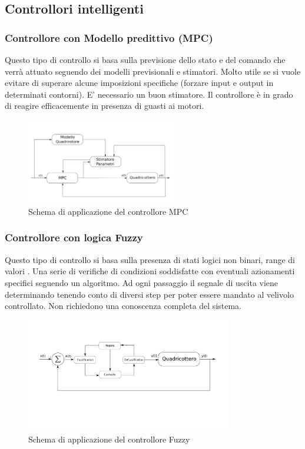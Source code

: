 \subsection{Controllori intelligenti}

\subsubsection{Controllore con Modello predittivo (MPC)}

Questo tipo di controllo si basa sulla previsione dello stato e del comando che verrà attuato seguendo dei modelli previsionali e stimatori. Molto utile se si vuole evitare di superare alcune imposizioni specifiche (forzare input e output in determinati contorni).
E' necessario un buon stimatore. Il controllore è in grado di reagire efficacemente in presenza di guasti ai motori.

\begin{figure}
	\centering
	\includegraphics[width=0.6\textwidth]{SistemaQuadrirotore/Figure/MPC}
	\caption{Schema di applicazione del controllore MPC}
\end{figure}

\subsubsection{Controllore con logica Fuzzy}

Questo tipo di controllo si basa sulla presenza di stati logici non binari, range di valori  . Una serie di verifiche di condizioni soddisfatte con eventuali azionamenti specifici seguendo un algoritmo. Ad ogni passaggio il segnale di uscita viene determinando tenendo conto di diversi step per poter essere mandato al velivolo controllato. Non richiedono una conoscenza completa del sistema.

\begin{figure}
	\centering
	\includegraphics[width=0.8\textwidth]{SistemaQuadrirotore/Figure/Fuzzy}
	\caption{Schema di applicazione del controllore Fuzzy}
\end{figure}

